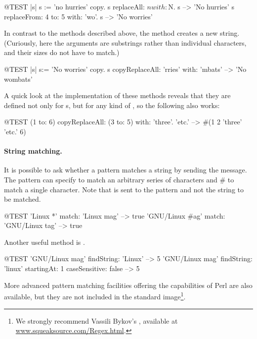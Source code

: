 \documentclass[a4paper,10pt,twoside]{book}
\begin{document}
\begin{code}{@TEST |s| s := 'no hurries' copy.}
s replaceAll: $n with: $N.
s --> 'No hurries'
s replaceFrom: 4 to: 5 with: 'wo'.
s --> 'No worries'
\end{code}

In contrast to the methods described above, the method  creates a new string.
(Curiously, here the arguments are substrings rather than individual characters, and their sizes do not have to match.)

\begin{code}{@TEST |s| s:= 'No worries' copy.}
s copyReplaceAll: 'rries' with: 'mbats' --> 'No wombats'
\end{code}

A quick look at the implementation of these methods reveals that they are defined not only for s, but for any kind of , so the following also works:

\begin{code}{@TEST}
(1 to: 6) copyReplaceAll: (3 to: 5) with: { 'three'. 'etc.' } --> #(1 2 'three' 'etc.' 6)
\end{code}

\paragraph{String matching.}
It is possible to ask whether a pattern matches a string by sending the  message.
The pattern can specify \ct{*} to match an arbitrary series of characters and \# to match a single character. Note that  is sent to the pattern and not the string to be matched.
\begin{code}{@TEST}
'Linux *' match: 'Linux mag'                      --> true
'GNU/Linux #ag' match: 'GNU/Linux tag' --> true
\end{code}

Another useful method is .
\begin{code}{@TEST}
'GNU/Linux mag' findString: 'Linux'                                                      --> 5
'GNU/Linux mag' findString: 'linux' startingAt: 1 caseSensitive: false  --> 5
\end{code}

More advanced pattern matching facilities offering the capabilities of Perl are also available, but they are not included in the standard image\footnote{We strongly recommend Vassili Bykov's , available at \url{www.squeaksource.com/Regex.html}.
}.
\end{document}
